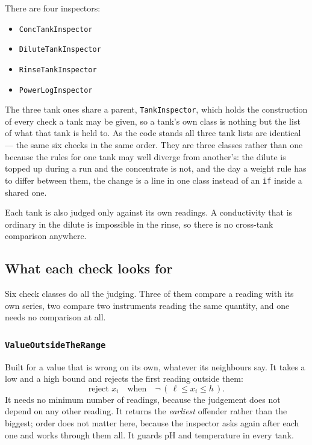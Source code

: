 There are four inspectors:

\begin{itemize}[nosep]
  \item \texttt{ConcTankInspector}
  \item \texttt{DiluteTankInspector}
  \item \texttt{RinseTankInspector}
  \item \texttt{PowerLogInspector}
\end{itemize}

\noindent The three tank ones share a parent,
\texttt{TankInspector}, which holds the construction of every check a tank may be given, so a
tank's own class is nothing but the list of what that tank is held to. As the code stands all
three tank lists are identical --- the same six checks in the same order. They are three
classes rather than one because the rules for one tank may well diverge from another's: the
dilute is topped up during a run and the concentrate is not, and the day a weight rule has to
differ between them, the change is a line in one class instead of an \texttt{if} inside a
shared one.

Each tank is also judged only against its own readings. A conductivity that is ordinary in the
dilute is impossible in the rinse, so there is no cross-tank comparison anywhere.

\subsection{What each check looks for}

Six check classes do all the judging. Three of them compare a reading with its own series,
two compare two instruments reading the same quantity, and one needs no comparison at all.

\subsubsection*{\texttt{ValueOutsideTheRange}}

Built for a value that is wrong on its own, whatever its neighbours say. It takes a low and a
high bound and rejects the first reading outside them:
\begin{equation}
  \label{eq:outside-range}
  \text{reject } x_i \quad\text{when}\quad \neg\,(\,\ell \le x_i \le h\,).
\end{equation}
It needs no minimum number of readings, because the judgement does not depend on any other
reading. It returns the \emph{earliest} offender rather than the biggest; order does not
matter here, because the inspector asks again after each one and works through them all. It
guards pH and temperature in every tank.

